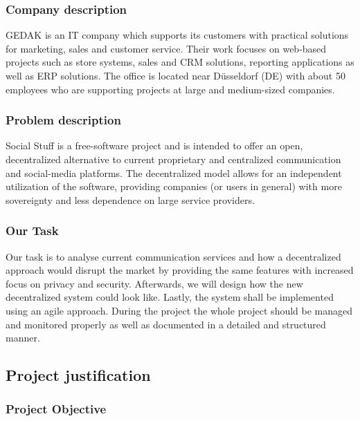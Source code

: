 \subsubsection{Company description}

GEDAK is an IT company which supports its customers with practical solutions for marketing, sales and customer service.
Their work focuses on web-based projects such as store systems, sales and CRM solutions, reporting applications as well
as ERP solutions.
The office is located near Düsseldorf (DE) with about 50 employees who are supporting projects at large and medium-sized
companies.

\subsubsection{Problem description}

Social Stuff is a free-software project and is intended to offer an open, decentralized alternative to current
proprietary and centralized communication and social-media platforms.
The decentralized model allows for an independent utilization of the software, providing companies (or users in general)
with more sovereignty and less dependence on large service providers.

\subsubsection{Our Task}

Our task is to analyse current communication services and how a decentralized approach would disrupt the market by
providing the same features with increased focus on privacy and security.
Afterwards, we will design how the new decentralized system could look like.
Lastly, the system shall be implemented using an agile approach.
During the project the whole project should be managed and monitored properly as well as documented in a detailed and
structured manner.

\subsection{Project justification}\label{subsec:project-justification}

\subsubsection{Project Objective}

